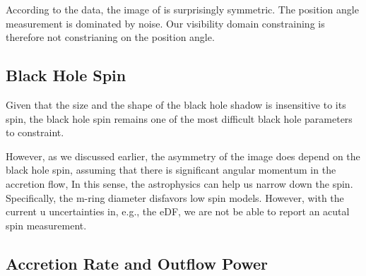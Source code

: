 
According to the data, the image of \sgra is surprisingly symmetric.
The position angle measurement is dominated by noise.
Our visibility domain constraining is therefore not constrianing on
the position angle.

\subsection{Black Hole Spin}


Given that the size and the shape of the black hole shadow is
insensitive to its spin, the black hole spin remains one of the most
difficult black hole parameters to constraint.

However, as we discussed earlier, the asymmetry of the image does
depend on the black hole spin, assuming that there is significant
angular momentum in the accretion flow, In this sense, the
astrophysics can help us narrow down the spin.
Specifically, the m-ring diameter disfavors low spin models.
However, with the current u uncertainties in, e.g., the eDF, we are
not be able to report an acutal spin measurement.

\subsection{Accretion Rate and Outflow Power}


